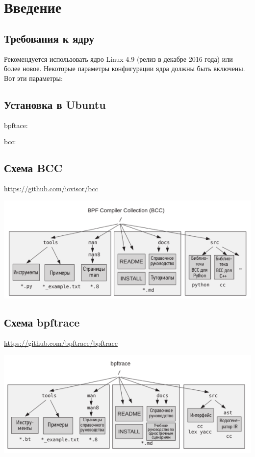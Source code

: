 \section{Введение}

\subsection{Требования к ядру}
Рекомендуется использовать ядро Linux 4.9 (релиз в декабре 2016 года) или более
новое. Некоторые параметры конфигурации ядра должны быть включены.
Вот эти параметры: \\

\subsection{Установка в Ubuntu}

\noindent bpftace: \\

\noindent bcc: \\


\subsection{Схема BCC}
\url{https://github.com/iovisor/bcc}

\includegraphics[width=0.8\linewidth]{structure_bcc.png}

\subsection{Схема bpftrace}
\url{https://github.com/bpftrace/bpftrace}

\includegraphics[width=1.0\linewidth]{structure_bpftrace.png}

